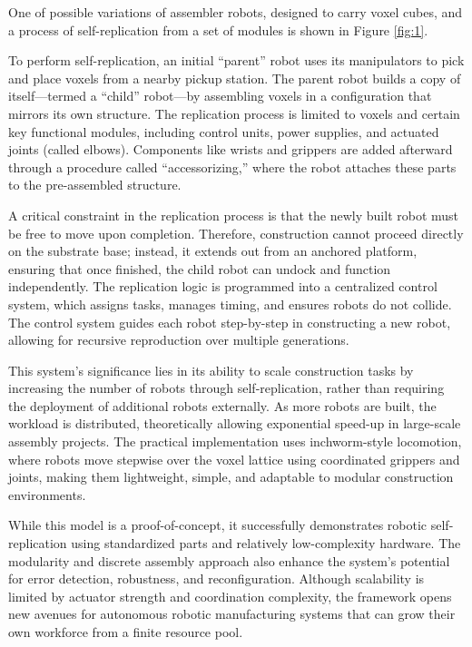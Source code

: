 One of possible variations of assembler robots, designed
to carry voxel cubes, and a process of self-replication 
from a set of modules is shown in Figure \ref{fig:1}.

To perform self-replication, an initial “parent” robot uses its manipulators to pick 
and place voxels from a nearby pickup station. The parent robot builds a copy 
of itself—termed a “child” robot—by assembling voxels in a configuration that 
mirrors its own structure. The replication process is limited to voxels and certain 
key functional modules, including control units, power supplies, and 
actuated joints (called elbows). Components like wrists and grippers are 
added afterward through a procedure called “accessorizing,” where the 
robot attaches these parts to the pre-assembled structure.

A critical constraint in the replication process is that the newly built robot must 
be free to move upon completion. Therefore, construction cannot proceed directly 
on the substrate base; instead, it extends out from an anchored platform, 
ensuring that once finished, the child robot can undock and function independently. 
The replication logic is programmed into a centralized control system, 
which assigns tasks, manages timing, and ensures robots do not collide. 
The control system guides each robot step-by-step in constructing a new robot, 
allowing for recursive reproduction over multiple generations.

This system's significance lies in its ability to scale construction tasks 
by increasing the number of robots through self-replication, 
rather than requiring the deployment of additional robots externally. 
As more robots are built, the workload is distributed, theoretically 
allowing exponential speed-up in large-scale assembly projects. 
The practical implementation uses inchworm-style locomotion, where robots 
move stepwise over the voxel lattice using coordinated grippers and joints, 
making them lightweight, simple, and adaptable to modular construction environments.

While this model is a proof-of-concept, it successfully demonstrates robotic 
self-replication using standardized parts and relatively low-complexity hardware. 
The modularity and discrete assembly approach also enhance the system’s 
potential for error detection, robustness, and reconfiguration. 
Although scalability is limited by actuator strength and coordination complexity, 
the framework opens new avenues for autonomous robotic manufacturing systems 
that can grow their own workforce from a finite resource pool.


